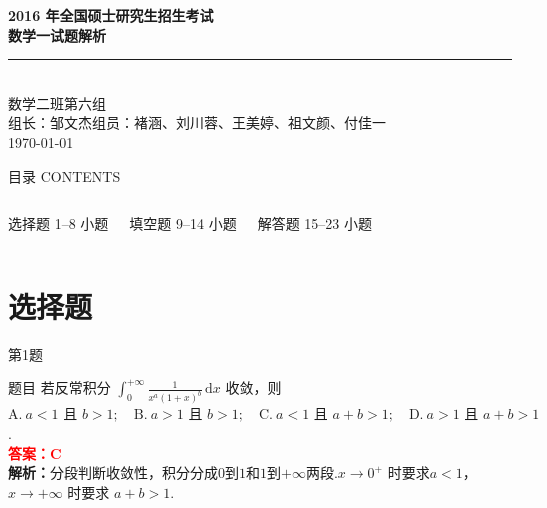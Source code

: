 \documentclass[aspectratio=169]{beamer}
\begin{document}
\begin{frame}[plain]
\vfill
\begin{center}
{\Huge\bfseries\color{mycolor} 2016 年全国硕士研究生招生考试}\\[0.5em]
{\Huge\bfseries\color{mycolor} 数学一试题解析}\\[2em]
\rule{0.8\textwidth}{2pt}\\[2em]
{\large 数学二班第六组}\\[0.6em]
{\normalsize 组长：邹文杰\quad 组员：褚涵、刘川蓉、王美婷、祖文颜、付佳一}\\[1.5em]
{\normalsize\color{gray}\today}
\end{center}
\vfill
\end{frame}

\begin{frame}{目录 CONTENTS}
\begin{columns}[T]
\begin{block}{选择题}
1--8 小题
\end{block}
\begin{block}{填空题}
9--14 小题
\end{block}
\begin{block}{解答题}
15--23 小题
\end{block}
\end{columns}
\end{frame}

\section{选择题}

\begin{frame}{第1题}
\begin{block}{题目}
若反常积分 \(\displaystyle\int_{0}^{+\infty} \frac{1}{x^{a}(1+x)^{b}} \,\mathrm{d}x\) 收敛，则
$\mathrm{A.}\ a<1 \text{ 且 } b>1; \quad
\mathrm{B.}\ a>1 \text{ 且 } b>1; \quad
\mathrm{C.}\ a<1 \text{ 且 } a+b>1; \quad
\mathrm{D.}\ a>1 \text{ 且 } a+b>1$.
\\
\textcolor{red}{\textbf{答案：}$\mathbf{C}$} \\
\textbf{解析：}分段判断收敛性，积分分成$0$到$1$和$1$到$+\infty$两段.$x\to0^+$ 时要求$a<1$，$x\to+\infty$ 时要求 $a+b>1$.
\end{block}
\end{frame}
\end{document}
